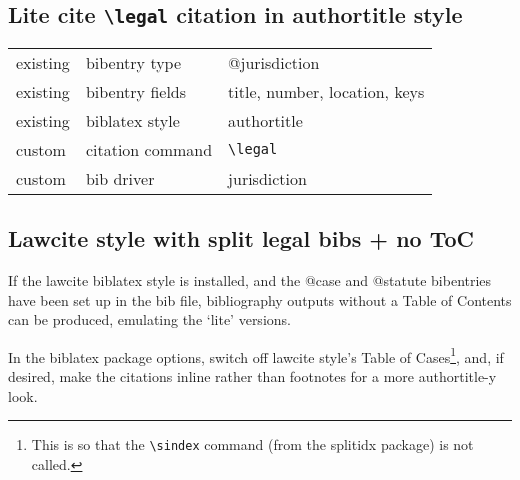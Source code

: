 \documentclass[12pt]{article}
\newcommand\goodoh{{\large\ftmark 🗸}}
\newcommand\cmd[1]{\texttt{\textbackslash #1}}
\begin{document}


\subsection{Lite cite \cmd{legal} citation in authortitle style}


\begin{tabular}{lll}
existing   &    bibentry type               & \ttfamily @jurisdiction \\
existing   &    bibentry fields              & \ttfamily title, number, location, keys \\
existing   &    biblatex style                & \ttfamily authortitle \\
custom    &    citation command           & \cmd{legal} \\
custom    &    bib driver                    & \ttfamily jurisdiction \\
\end{tabular}
\bigskip


%







\subsection{Lawcite style with split legal bibs + no ToC}

If the lawcite biblatex style is installed, and the @case and @statute bibentries have been set up in the bib file, bibliography outputs without a Table of Contents can be produced, emulating the `lite' versions.

In the biblatex package options, switch off lawcite style's Table of Cases\footnote{This is so that the \cmd{sindex} command (from the splitidx package) is not called.}, and, if desired, make the citations inline rather than footnotes for a more authortitle-y look.
\end{document}
